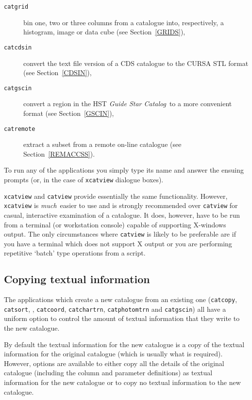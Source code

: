 \documentclass[twoside,11pt]{article}
\renewcommand{\_}{\texttt{\symbol{95}}}
\begin{document}
\begin{description}
  \item[ {\tt catgrid} ] bin one, two or three columns from a catalogue
   into, respectively, a histogram, image or data cube
   (see Section~\ref{GRIDS}),

  \item[ {\tt catcdsin} ] convert the text file version of a CDS
   catalogue to the CURSA STL format (see Section~\ref{CDSIN}),

  \item[ {\tt catgscin} ] convert a region in the HST {\it Guide Star
   Catalog}\, to a more convenient format (see Section~\ref{GSCIN}),

  \item[ {\tt catremote} ] extract a subset from a remote on-line
   catalogue (see Section~\ref{REMACCSS}).

\end{description}

To run any of the applications you simply type its name and answer the
ensuing prompts (or, in the case of {\tt xcatview} dialogue boxes).

{\tt xcatview} and {\tt catview} provide essentially the same
functionality. However, {\tt xcatview} is {\it much}\, easier to use
and is strongly recommended over {\tt catview} for casual,
interactive examination of a catalogue. It does, however, have to be
run from a terminal (or workstation console) capable of supporting
X-windows output. The only circumstances where {\tt catview} is likely
to be preferable are if you have a terminal which does not support X
output or you are performing repetitive `batch' type operations from a
script.

\subsection{\label{COPYTEXT}Copying textual information}

The applications which create a new catalogue from an existing one
({\tt catcopy}, {\tt catsort},
, {\tt catcoord}, {\tt catchartrn},
{\tt catphotomtrn} and {\tt catgscin}) all have a uniform option to
control the amount of textual information that they write to the new
catalogue.

By default the textual information for the new catalogue is a copy of
the textual information for the original catalogue (which is usually
what is required).  However, options are available to either copy all
the details of the original catalogue (including the column and
parameter definitions) as textual information for the new catalogue or
to copy no textual information to the new catalogue.
\end{document}
